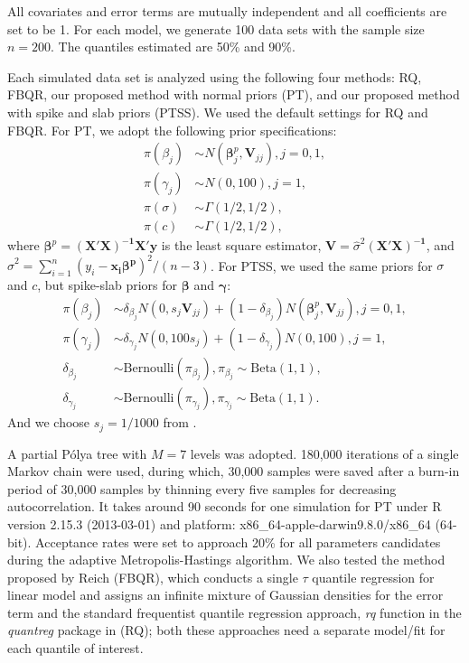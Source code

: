 \documentclass[12pt]{article}
\newcommand{\polya}{P\'{o}lya}
\begin{document}
All covariates and error terms are mutually independent and all
coefficients are set to be 1. For each model, we generate 100 data
sets with the sample size $n=200$. The quantiles estimated are 50\% and
90\%.

Each simulated data set is analyzed using the following four methods:
RQ, FBQR, our proposed method with normal priors (PT), and our
proposed method with spike and slab priors (PTSS).  We used the
default settings for RQ and FBQR.  For PT, we adopt the following
prior specifications:
\begin{align*}
  \pi(\beta_j) & \sim N(\bm \beta_j^p, \bm V_{jj}) , j = 0, 1,\\
  \pi(\gamma_j) & \sim N(0, 100), j = 1,\\
  \pi(\sigma) & \sim \Gamma (1/2, 1/2), \\
  \pi(c) & \sim \Gamma(1/2, 1/2),
\end{align*}
where $\bm \beta^p = \bm{(X'X)^{-1}X'y}$ is the least square
estimator, $\bm V = \hat{\sigma}^2\bm{(X'X)^{-1}}$, and $\hat{\sigma}^2 =
\sum_{i = 1}^n (y_i - \bm {x_i \beta^p})^2/ (n - 3)$.
For PTSS, we used the same priors for $\sigma$ and $c$, but spike-slab
priors for $\bm \beta$ and $\bm \gamma$:
\begin{align*}
  \pi(\beta_j) & \sim \delta_{\beta_j}N(0, s_j\bm V_{jj}) +  (1 - \delta_{\beta_j})N(\bm \beta_j^p, \bm V_{jj}) , j = 0, 1, \\
  \pi(\gamma_j) & \sim \delta_{\gamma_j}N(0, 100s_j) + (1 - \delta_{\gamma_j}) N(0, 100), j = 1, \\
  \delta_{\beta_j} & \sim \mbox{Bernoulli}(\pi_{\beta_j}) , \pi_{\beta_j} \sim \mbox{Beta}(1, 1),\\
  \delta_{\gamma_j} & \sim \mbox{Bernoulli}(\pi_{\gamma_j}),
  \pi_{\gamma_j} \sim \mbox{Beta}(1, 1).
\end{align*}
And we choose $s_j = 1/1000$ from \cite{george1993}.

A partial \polya{} tree with $M=7$ levels was adopted. 180,000 iterations of a
single Markov chain were used, during which, 30,000 samples were saved
after a burn-in period of 30,000 samples by thinning every five samples for
decreasing autocorrelation.  It takes around 90 seconds
for one simulation for PT under R version 2.15.3 (2013-03-01) and
platform: x86\_64-apple-darwin9.8.0/x86\_64 (64-bit). Acceptance rates
were set to approach 20\% for all parameters
candidates during the adaptive Metropolis-Hastings algorithm.  We also
tested the method proposed by Reich (FBQR), which conducts a single
$\tau$ quantile regression for linear model and assigns an infinite
mixture of Gaussian densities for the error term and the standard
frequentist quantile regression approach, \textit{rq} function in the
\textit{quantreg} package \citep{quantreg} in \cite{R} (RQ); both these approaches need a separate model/fit for each quantile of interest.
\end{document}
